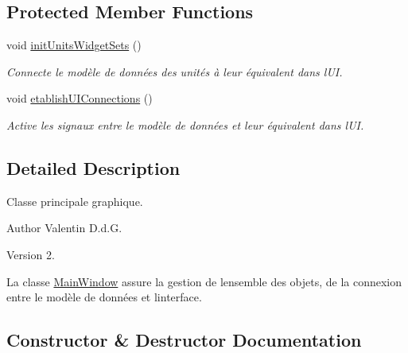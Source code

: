 \subsection*{Protected Member Functions}
\begin{DoxyCompactItemize}
\item 
\hypertarget{class_main_window_a1cf685529fec5883de57117fa389cbf4}{}void \hyperlink{class_main_window_a1cf685529fec5883de57117fa389cbf4}{init\+Units\+Widget\+Sets} ()\label{class_main_window_a1cf685529fec5883de57117fa389cbf4}

\begin{DoxyCompactList}\small\item\em Connecte le modèle de données des unités à leur équivalent dans l\textquotesingle{}U\+I. \end{DoxyCompactList}\item 
\hypertarget{class_main_window_a7d2d0020bae66ceb47a98a6a7de022d1}{}void \hyperlink{class_main_window_a7d2d0020bae66ceb47a98a6a7de022d1}{etablish\+U\+I\+Connections} ()\label{class_main_window_a7d2d0020bae66ceb47a98a6a7de022d1}

\begin{DoxyCompactList}\small\item\em Active les signaux entre le modèle de données et leur équivalent dans l\textquotesingle{}U\+I. \end{DoxyCompactList}\end{DoxyCompactItemize}


\subsection{Detailed Description}
Classe principale graphique. 

\begin{DoxyAuthor}{Author}
Valentin D.\+d.\+G. 
\end{DoxyAuthor}
\begin{DoxyVersion}{Version}
2.
\end{DoxyVersion}
La classe \hyperlink{class_main_window}{Main\+Window} assure la gestion de l\textquotesingle{}ensemble des objets, de la connexion entre le modèle de données et l\textquotesingle{}interface. 

\subsection{Constructor \& Destructor Documentation}
\hypertarget{class_main_window_a8b244be8b7b7db1b08de2a2acb9409db}{}
